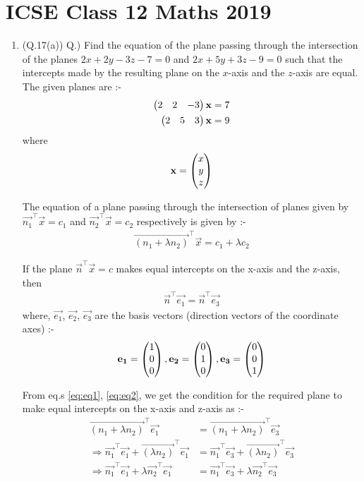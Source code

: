 \documentclass[journal,12pt,twocolumn]{IEEEtran}
\renewcommand\thesection{\arabic{section}}
\begin{document}
\section{ICSE Class 12 Maths 2019}
\begin{enumerate}[label=\thesection.\arabic*.,ref=\thesection.\theenumi]
\item (Q.17(a)) Q.) Find the equation of the plane passing through the intersection of the planes $2x + 2y - 3z - 7 = 0$ and $2x + 5y + 3z - 9 = 0$ such that the intercepts made by the resulting plane on the $x$-axis and the $z$-axis are equal.\\

\solution
The given planes are :-
\begin{align}
\begin{pmatrix}2 & 2 & -3\end{pmatrix}\mathbf{x}=7
\\
\begin{pmatrix}2 & 5 & 3\end{pmatrix}\mathbf{x}=9
\end{align}
where
\begin{align}
\mathbf{x} = \begin{pmatrix}x \\ y \\ z\end{pmatrix}
\end{align}

The equation of a plane passing through the intersection of planes given by $\vec{n_1}^{\top}\vec{x} = c_1$ and $\vec{n_2}^{\top}\vec{x} = c_2$ respectively is given by :-
\begin{align}
\vec{\left( n_1 + \lambda n_2 \right)}^{\top}\vec{x} = c_1 + \lambda c_2 \label{eq:eq1}
\end{align}

If the plane $\vec{n}^{\top}\vec{x} = c$ makes equal intercepts on the x-axis and the z-axis, then
\begin{align}
\vec{n}^{\top}\vec{e_1} = \vec{n}^{\top}\vec{e_3} \label{eq:eq2}
\end{align}
where, $\vec{e_1}$, $\vec{e_2}$, $\vec{e_3}$ are the basis vectors (direction vectors of the coordinate axes) :-
\begin{align}
\mathbf{e_1} = \begin{pmatrix}1 \\ 0 \\ 0\end{pmatrix}, \mathbf{e_2} = \begin{pmatrix}0 \\ 1 \\ 0\end{pmatrix}, \mathbf{e_3} = \begin{pmatrix}0 \\ 0 \\ 1\end{pmatrix}
\end{align}

From eq.s \eqref{eq:eq1}, \eqref{eq:eq2}, we get the condition for the required plane to make equal intercepts on the x-axis and z-axis as :-
\begin{align}
\vec{\left( n_1 + \lambda n_2 \right)}^{\top}\vec{e_1} &= \vec{\left( n_1 + \lambda n_2 \right)}^{\top}\vec{e_3} \\
\Rightarrow \vec{n_1}^{\top}\vec{e_1} + \vec{\left( \lambda n_2 \right)}^{\top}\vec{e_1} &= \vec{n_1}^{\top}\vec{e_3} + \vec{\left( \lambda n_2 \right)}^{\top}\vec{e_3} \\
\Rightarrow \vec{n_1}^{\top}\vec{e_1} + \lambda \vec{n_2}^{\top}\vec{e_1} &= \vec{n_1}^{\top}\vec{e_3} + \lambda \vec{n_2}^{\top}\vec{e_3}
\end{align}


\end{enumerate}
\end{document}
